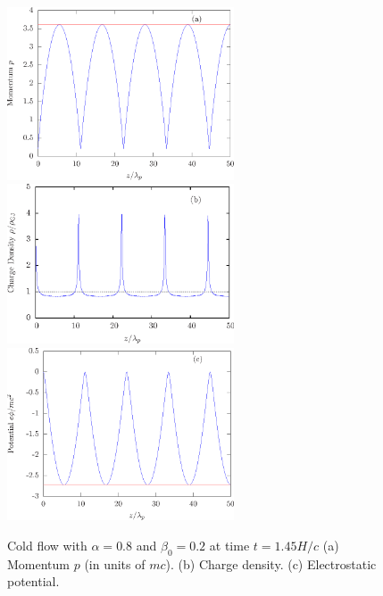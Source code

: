 \begin{figure}%
\begin{center}
\includegraphics[width=0.6\textwidth]{pics/chap2/f3a.eps}\\
\includegraphics[width=0.6\textwidth]{pics/chap2/f3b.eps}\\
\includegraphics[width=0.6\textwidth]{pics/chap2/f3c.eps}
\caption{Cold flow with $\alpha=0.8$ and $\beta_0=0.2$ at time $t=1.45H/c$
(a) Momentum $p$ (in units of $mc$). (b) Charge density.
(c) Electrostatic potential.
}
\label{fig:alpha0.8cold}
\end{center}
\end{figure}

